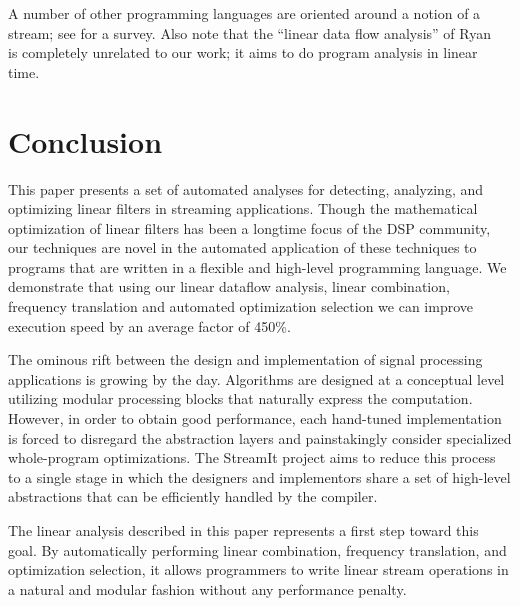 \documentclass{sig-alternate}
\begin{document}
{A number of other programming languages are oriented around a notion
of a stream; see \cite{survey97} for a survey.  Also note that the
``linear data flow analysis'' of Ryan~\cite{ryan92} is completely
unrelated to our work; it aims to do program analysis in linear time.



\section{Conclusion}
\label{sec:conclusion}

This paper presents a set of automated analyses for detecting,
analyzing, and optimizing linear filters in streaming applications.
Though the mathematical optimization of linear filters has been a
longtime focus of the DSP community, our techniques are novel in the
automated application of these techniques to programs that are written
in a flexible and high-level programming language.  We demonstrate
that using our linear dataflow analysis, linear combination, frequency
translation and automated optimization selection we can improve
execution speed by an average factor of 450\%.

The ominous rift between the design and implementation of signal
processing applications is growing by the day.  Algorithms are
designed at a conceptual level utilizing modular processing blocks
that naturally express the computation.  However, in order to obtain
good performance, each hand-tuned implementation is forced to
disregard the abstraction layers and painstakingly consider
specialized whole-program optimizations. The StreamIt project aims to
reduce this process to a single stage in which the designers and
implementors share a set of high-level abstractions that can be
efficiently handled by the compiler.

The linear analysis described in this paper represents a first step
toward this goal.  By automatically performing linear combination,
frequency translation, and optimization selection, it allows
programmers to write linear stream operations in a natural and modular
fashion without any performance penalty.

}
\end{document}
